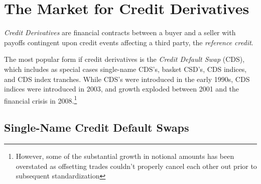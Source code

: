 \documentclass[a4paper,12pt]{scrartcl}
\begin{document}
\newpage
\section{The Market for Credit Derivatives}

\emph{Credit Derivatives} are financial contracts between a buyer and
a seller with payoffs contingent upon credit events affecting
a third party, the \emph{reference credit}.  

The most popular form if credit derivatives is the \emph{Credit Default
Swap} (CDS), which includes as special cases single-name CDS's,
basket CSD's, CDS indices, and CDS index tranches.  While CDS's were
introduced in the early 1990s, CDS indices were introduced in 2003,
and growth exploded between 2001 and the financial crisis in 
2008.\footnote{However, some of the substantial growth in notional 
amounts has been overstated as offsetting trades couldn't properly
cancel each other out prior to subsequent standardization}

\subsection{Single-Name Credit Default Swaps}
\end{document}
